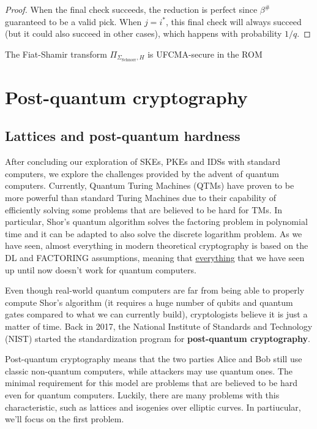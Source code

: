 \documentclass[a4paper, 12pt]{report}
\begin{document}
\begin{proof}
        When the final check succeeds, the reduction is perfect since $\beta^{\#}$ guaranteed to be a valid pick. When $j = i^*$, this final check will always succeed (but it could also succeed in other cases), which happens with probability $1/q$.
    \end{proof}

    \begin{framedcor}{}
        The Fiat-Shamir transform $\Pi_{\Sigma_{\text{Schnorr}}, H}$ is UFCMA-secure in the ROM
    \end{framedcor}

    \chapter{Post-quantum cryptography}

    \section{Lattices and post-quantum hardness}

    After concluding our exploration of SKEs, PKEs and IDSs with standard computers, we explore the challenges provided by the advent of quantum computers. Currently, Quantum Turing Machines (QTMs) have proven to be more powerful than standard Turing Machines due to their capability of efficiently solving some problems that are believed to be hard for TMs. In particular, Shor's quantum algorithm solves the factoring problem in polynomial time and it can be adapted to also solve the discrete logarithm problem. As we have seen, almost everything in modern theoretical cryptography is based on the DL and FACTORING assumptions, meaning that \underline{everything} that we have seen up until now doesn't work for quantum computers.

    Even though real-world quantum computers are far from being able to properly compute Shor's algorithm (it requires a huge number of qubits and quantum gates compared to what we can currently build), cryptologists believe it is just a matter of time. Back in 2017, the National Institute of Standards and Technology (NIST) started the standardization program for \textbf{post-quantum cryptography}.

    Post-quantum cryptography means that the two parties Alice and Bob still use classic non-quantum computers, while attackers may use quantum ones. The minimal requirement for this model are problems that are believed to be hard even for quantum computers. Luckily, there are many problems with this characteristic, such as lattices and isogenies over elliptic curves. In partiucular, we'll focus on the first problem.
\end{document}
